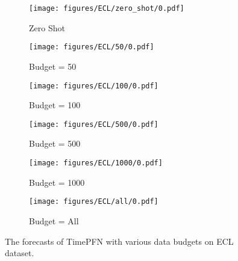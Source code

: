 \begin{figure*}[htp]
\centering

\begin{subfigure}{0.32\textwidth}
\texttt{[image: figures/ECL/zero\_shot/0.pdf]}
\caption{Zero Shot}
\end{subfigure}\hfill
\begin{subfigure}{0.32\textwidth}
\texttt{[image: figures/ECL/50/0.pdf]}
\caption{Budget = 50}
\end{subfigure}\hfill
\begin{subfigure}{0.32\textwidth}
\texttt{[image: figures/ECL/100/0.pdf]}
\caption{Budget = 100}
\end{subfigure}

\begin{subfigure}{0.32\textwidth}
\texttt{[image: figures/ECL/500/0.pdf]}
\caption{Budget = 500}
\end{subfigure}\hfill
\begin{subfigure}{0.32\textwidth}
\texttt{[image: figures/ECL/1000/0.pdf]}
\caption{Budget = 1000}
\end{subfigure}\hfill
\begin{subfigure}{0.32\textwidth}
\texttt{[image: figures/ECL/all/0.pdf]}
\caption{Budget = All}
\end{subfigure}

\caption{The forecasts of TimePFN with various data budgets on ECL dataset. }

\label{fig:ECL0}
\end{figure*}